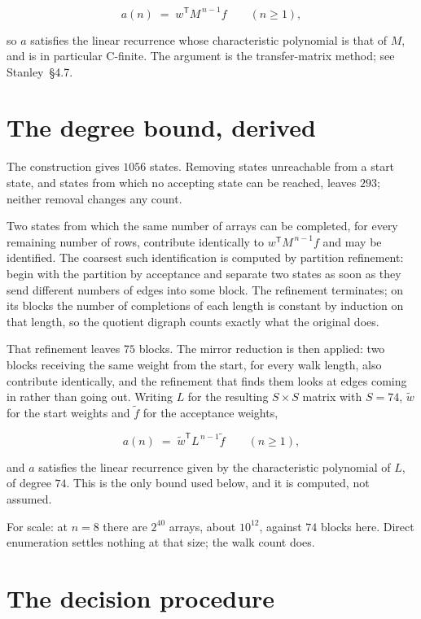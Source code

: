 \documentclass[11pt]{article}
\theoremstyle{definition}
\begin{document}
\[a(n) \;=\; w^{\mathsf T} M^{\,n-1} f \qquad (n \ge 1),\]

so $a$ satisfies the linear recurrence whose characteristic polynomial is that of $M$, and is in particular C-finite. The argument is the transfer-matrix method; see Stanley~\S4.7.

\section{The degree bound, derived}

The construction gives $1056$ states. Removing states unreachable from a start state, and states from which no accepting state can be reached, leaves $293$; neither removal changes any count.

Two states from which the same number of arrays can be completed, for every remaining number of rows, contribute identically to $w^{\mathsf T}M^{\,n-1}f$ and may be identified. The coarsest such identification is computed by partition refinement: begin with the partition by acceptance and separate two states as soon as they send different numbers of edges into some block. The refinement terminates; on its blocks the number of completions of each length is constant by induction on that length, so the quotient digraph counts exactly what the original does.

That refinement leaves $75$ blocks. The mirror reduction is then applied: two blocks receiving the same weight from the start, for every walk length, also contribute identically, and the refinement that finds them looks at edges coming in rather than going out. Writing $L$ for the resulting $S \times S$ matrix with $S = 74$, $\tilde w$ for the start weights and $\tilde f$ for the acceptance weights,

\[a(n) \;=\; \tilde w^{\mathsf T} L^{\,n-1} \tilde f \qquad (n \ge 1),\]

and $a$ satisfies the linear recurrence given by the characteristic polynomial of $L$, of degree $74$. This is the only bound used below, and it is computed, not assumed.

For scale: at $n = 8$ there are $2^{40}$ arrays, about $10^{12}$, against $74$ blocks here. Direct enumeration settles nothing at that size; the walk count does.

\section{The decision procedure}
\end{document}
